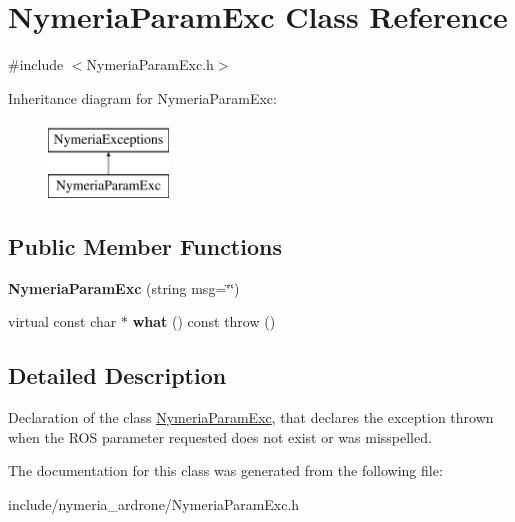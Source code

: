 \hypertarget{classNymeriaParamExc}{\section{\-Nymeria\-Param\-Exc \-Class \-Reference}
\label{classNymeriaParamExc}
}


{\ttfamily \#include $<$\-Nymeria\-Param\-Exc.\-h$>$}

\-Inheritance diagram for \-Nymeria\-Param\-Exc\-:\begin{figure}[H]
\begin{center}
\leavevmode
\includegraphics[height=2.000000cm]{classNymeriaParamExc}
\end{center}
\end{figure}
\subsection*{\-Public \-Member \-Functions}
\begin{DoxyCompactItemize}
\item 
\hypertarget{classNymeriaParamExc_a253c3cfe3e927036a1043836394cb6fe}{{\bfseries \-Nymeria\-Param\-Exc} (string msg=\char`\"{}\char`\"{})}\label{classNymeriaParamExc_a253c3cfe3e927036a1043836394cb6fe}

\item 
\hypertarget{classNymeriaParamExc_a7171011e1c64f0295f3eb3b5cec2b6da}{virtual const char $\ast$ {\bfseries what} () const   throw ()}\label{classNymeriaParamExc_a7171011e1c64f0295f3eb3b5cec2b6da}

\end{DoxyCompactItemize}


\subsection{\-Detailed \-Description}
\-Declaration of the class \hyperlink{classNymeriaParamExc}{\-Nymeria\-Param\-Exc}, that declares the exception thrown when the \-R\-O\-S parameter requested does not exist or was misspelled. 

\-The documentation for this class was generated from the following file\-:\begin{DoxyCompactItemize}
\item 
include/nymeria\-\_\-ardrone/\-Nymeria\-Param\-Exc.\-h\end{DoxyCompactItemize}
